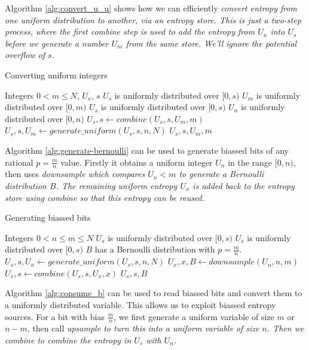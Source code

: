\documentclass[12pt]{article}
\begin{document}
Algorithm \ref{alg:convert_u_u} shows how we can efficiently \em convert \em entropy from one uniform distribution to another, via an entropy store. This is just a two-step process, where the first \em combine \em step is used to add the entropy from $U_n$ into $U_s$ before we generate a number $U_m$ from the same store. We'll ignore the potential overflow of $s$.

\begin{algorithm}
\caption{Converting uniform integers}
\label{alg:convert_u_u}
\begin{algorithmic}[1]
    \Require Integers $0 < m \le N$, $U_s$, $s$
    \Require $U_s$ is uniformly distributed over $[0,s)$
    \Require $U_m$ is uniformly distributed over $[0,m)$
    \Ensure  $U_s$ is uniformly distributed over $[0,s)$
    \Ensure  $U_n$ is uniformly distributed over $[0,n)$
    \State $U_s, s \gets combine(U_s, s, U_m, m)$
    \State $U_s, s, U_m \gets generate\_uniform(U_s, s, n, N)$
    \State \Return $U_s, s, U_m, m$
\EndProcedure
\end{algorithmic}
\end{algorithm}

Algorithm \ref{alg:generate-bernoulli} can be used to generate biassed bits of any rational $p=\frac{m}{n}$ value. Firstly it obtains a uniform integer $U_n$ in the range $[0,n)$, then uses \em downsample \em which compares $U_n<m$ to generate a Bernoulli distribution $B$. The remaining uniform entropy $U_x$ is added back to the entropy store using \em combine \em so that this entropy can be reused.

\begin{algorithm}
\caption{Generating biassed bits}
\label{alg:generate-bernoulli}
\begin{algorithmic}[1]
\Require Integers $0 < n \le m \le N$
\Require $U_s$ is uniformly distributed over $[0,s)$
\Ensure $U_s$ is uniformly distributed over $[0,s)$
\Ensure $B$ has a Bernoulli distribution with $p = \frac{m}{n}$.
    \State $U_s, s, U_n \gets generate\_uniform(U_s, s, n, N)$
    \State $U_x, x, B \gets downsample(U_n, n, m)$
    \State $U_s, s \gets combine(U_s, s, U_x, x)$
    \State \Return $U_s, s, B$
\EndProcedure
\end{algorithmic}
\end{algorithm}

Algorithm \ref{alg:consume_b} can be used to read biassed bits and convert them to a uniformly distributed variable. This allows us to exploit biassed entropy sources. For a bit with bias $\frac{m}{n}$, we first generate a uniform variable of size $m$ or $n-m$, then call \em upsample \em to turn this into a uniform variable of size $n$. Then we \em combine \em to combine the entropy in $U_s$ with $U_n$.
\end{document}
